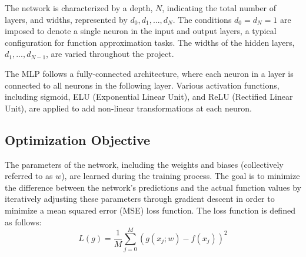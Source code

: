 \documentclass[11pt]{article}
\begin{document}
The network is characterized by a depth, $N$, indicating the total number of layers, and widths, represented by $d_0, d_1, ..., d_N$. The conditions $d_0 = d_N = 1$ are imposed to denote a single neuron in the input and output layers, a typical configuration for function approximation tasks. The widths of the hidden layers, $d_1, ..., d_{N-1}$, are varied throughout the project.

The MLP follows a fully-connected architecture, where each neuron in a layer is connected to all neurons in the following layer. Various activation functions, including sigmoid, ELU (Exponential Linear Unit), and ReLU (Rectified Linear Unit), are applied to add non-linear transformations at each neuron.

\subsection{Optimization Objective}
The parameters of the network, including the weights and biases (collectively referred to as $w$), are learned during the training process. The goal is to minimize the difference between the network's predictions and the actual function values by iteratively adjusting these parameters through gradient descent in order to minimize a mean squared error (MSE) loss function. The loss function is defined as follows:
\begin{equation}
    L(g) = \frac{1}{M} \sum_{j=0}^{M} (g(x_j;w) - f(x_j))^2
\end{equation}




\pagebreak



\end{document}
